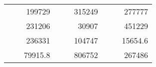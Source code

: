 \begin{table}[H]
\begin{tabular}{|ccrccrccc}
\rowcolor[HTML]{DAE8FC} 
\multicolumn{1}{|c|}{\cellcolor[HTML]{FFFFC7}}                                & \multicolumn{1}{c|}{\cellcolor[HTML]{DAE8FC}}                      & \multicolumn{1}{r|}{\cellcolor[HTML]{DAE8FC}199729}    & \multicolumn{1}{c|}{\cellcolor[HTML]{FFFFC7}}                                & \multicolumn{1}{c|}{\cellcolor[HTML]{DAE8FC}}                       & \multicolumn{1}{r|}{\cellcolor[HTML]{DAE8FC}315249}    & \multicolumn{1}{c|}{\cellcolor[HTML]{FFFFC7}}                                & \multicolumn{1}{c|}{\cellcolor[HTML]{DAE8FC}}                      & \multicolumn{1}{r|}{\cellcolor[HTML]{DAE8FC}277777}    \\ \cline{3-3} \cline{6-6} \cline{9-9} 
\multicolumn{1}{|c|}{\cellcolor[HTML]{FFFFC7}}                                & \multicolumn{1}{c|}{\cellcolor[HTML]{DAE8FC}}                      & \multicolumn{1}{r|}{\cellcolor[HTML]{DDFDFF}231206}    & \multicolumn{1}{c|}{\cellcolor[HTML]{FFFFC7}}                                & \multicolumn{1}{c|}{\cellcolor[HTML]{DAE8FC}}                       & \multicolumn{1}{r|}{\cellcolor[HTML]{DDFDFF}30907}     & \multicolumn{1}{c|}{\cellcolor[HTML]{FFFFC7}}                                & \multicolumn{1}{c|}{\cellcolor[HTML]{DAE8FC}}                      & \multicolumn{1}{r|}{\cellcolor[HTML]{DDFDFF}451229}    \\ \cline{3-3} \cline{6-6} \cline{9-9} 
\rowcolor[HTML]{DAE8FC} 
\multicolumn{1}{|c|}{\cellcolor[HTML]{FFFFC7}}                                & \multicolumn{1}{c|}{\cellcolor[HTML]{DAE8FC}}                      & \multicolumn{1}{r|}{\cellcolor[HTML]{DAE8FC}236331}    & \multicolumn{1}{c|}{\cellcolor[HTML]{FFFFC7}}                                & \multicolumn{1}{c|}{\cellcolor[HTML]{DAE8FC}}                       & \multicolumn{1}{r|}{\cellcolor[HTML]{DAE8FC}104747}    & \multicolumn{1}{c|}{\cellcolor[HTML]{FFFFC7}}                                & \multicolumn{1}{c|}{\cellcolor[HTML]{DAE8FC}}                      & \multicolumn{1}{r|}{\cellcolor[HTML]{DAE8FC}15654.6}   \\ \cline{3-3} \cline{6-6} \cline{9-9} 
\multicolumn{1}{|c|}{\cellcolor[HTML]{FFFFC7}}                                & \multicolumn{1}{c|}{\cellcolor[HTML]{DAE8FC}}                      & \multicolumn{1}{r|}{\cellcolor[HTML]{DDFDFF}79915.8}   & \multicolumn{1}{c|}{\cellcolor[HTML]{FFFFC7}}                                & \multicolumn{1}{c|}{\cellcolor[HTML]{DAE8FC}}                       & \multicolumn{1}{r|}{\cellcolor[HTML]{DDFDFF}806752}    & \multicolumn{1}{c|}{\cellcolor[HTML]{FFFFC7}}                                & \multicolumn{1}{c|}{\cellcolor[HTML]{DAE8FC}}                      & \multicolumn{1}{r|}{\cellcolor[HTML]{DDFDFF}267486}    \\ \cline{3-3} \cline{6-6} \cline{9-9} 

\end{tabular}
\end{table}
